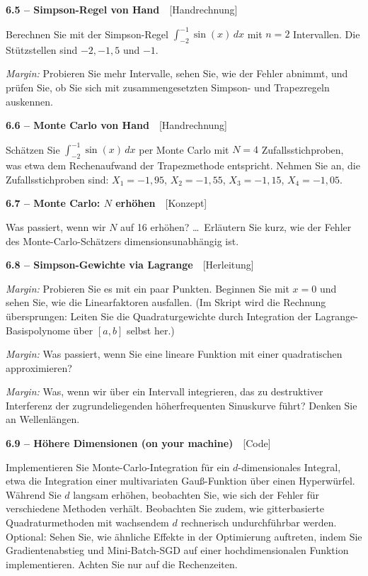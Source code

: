 \documentclass[a4paper,10pt]{article}
\newcommand{\aufg}[2]{%
  \par\vspace{3pt}
  {\bfseries\color{accent2} #1}~~{\footnotesize\color{accent2}[#2]}\par\vspace{1pt}}
\begin{document}
\aufg{6.5 \;--\; Simpson-Regel von Hand}{Handrechnung}
Berechnen Sie mit der Simpson-Regel $\int_{-2}^{-1}\sin(x)\,dx$ mit $n=2$ Intervallen.
Die Stützstellen sind $-2,-1{,}5$ und $-1$.
\par\textit{Margin:} Probieren Sie mehr Intervalle, sehen Sie, wie der Fehler abnimmt,
und prüfen Sie, ob Sie sich mit zusammengesetzten Simpson- und Trapezregeln auskennen.

\aufg{6.6 \;--\; Monte Carlo von Hand}{Handrechnung}
Schätzen Sie $\int_{-2}^{-1}\sin(x)\,dx$ per Monte Carlo mit $N=4$ Zufallsstichproben,
was etwa dem Rechenaufwand der Trapezmethode entspricht. Nehmen Sie an, die
Zufallsstichproben sind: $X_1=-1{,}95$, $X_2=-1{,}55$, $X_3=-1{,}15$, $X_4=-1{,}05$.

\aufg{6.7 \;--\; Monte Carlo: $N$ erhöhen}{Konzept}
Was passiert, wenn wir $N$ auf 16 erhöhen? \dots\ Erläutern Sie kurz, wie der Fehler
des Monte-Carlo-Schätzers dimensionsunabhängig ist.

\aufg{6.8 \;--\; Simpson-Gewichte via Lagrange}{Herleitung}
\textit{Margin:} Probieren Sie es mit ein paar Punkten. Beginnen Sie mit $x=0$ und
sehen Sie, wie die Linearfaktoren ausfallen. (Im Skript wird die Rechnung übersprungen:
Leiten Sie die Quadraturgewichte durch Integration der Lagrange-Basispolynome über
$[a,b]$ selbst her.)
\par\textit{Margin:} Was passiert, wenn Sie eine lineare Funktion mit einer
quadratischen approximieren?
\par\textit{Margin:} Was, wenn wir über ein Intervall integrieren, das zu destruktiver
Interferenz der zugrundeliegenden höherfrequenten Sinuskurve führt? Denken Sie an
Wellenlängen.

\aufg{6.9 \;--\; Höhere Dimensionen (on your machine)}{Code}
Implementieren Sie Monte-Carlo-Integration für ein $d$-dimensionales Integral, etwa die
Integration einer multivariaten Gauß-Funktion über einen Hyperwürfel. Während Sie $d$
langsam erhöhen, beobachten Sie, wie sich der Fehler für verschiedene Methoden verhält.
Beobachten Sie zudem, wie gitterbasierte Quadraturmethoden mit wachsendem $d$
rechnerisch undurchführbar werden. Optional: Sehen Sie, wie ähnliche Effekte in der
Optimierung auftreten, indem Sie Gradientenabstieg und Mini-Batch-SGD auf einer
hochdimensionalen Funktion implementieren. Achten Sie nur auf die Rechenzeiten.
\end{document}
